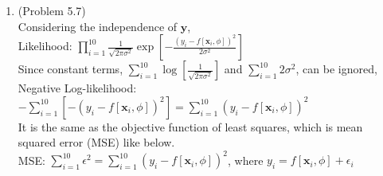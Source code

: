 \documentclass[10pt]{article}
\begin{document}
\begin{enumerate}
\

\item (Problem 5.7) \\
	Considering the independence of $\textbf{y}$, \\
	Likelihood: $\prod_{i=1}^{10} \frac{1}{\sqrt{2\pi\sigma^2}}\exp[-\frac{(y_i-f[\textbf{x}_i, \phi])^2}{2\sigma^2}]$ \\
	Since constant terms, $\sum_{i=1}^{10}\log[\frac{1}{\sqrt{2\pi\sigma^2}}]$ and $\sum_{i=1}^{10}2\sigma^2$, can be ignored, \\
	Negative Log-likelihood: $-\sum_{i=1}^{10} [-(y_i-f[\textbf{x}_i, \phi])^2]=\sum_{i=1}^{10} (y_i-f[\textbf{x}_i, \phi])^2$ \\
	It is the same as the objective function of least squares, which is mean squared error (MSE) like below. \\
	MSE: $\sum_{i=1}^{10} \epsilon^2=\sum_{i=1}^{10} (y_i-f[\textbf{x}_i, \phi])^2$, where $y_i=f[\textbf{x}_i, \phi]+\epsilon_i$
	

\

\end{enumerate}
\end{document}
